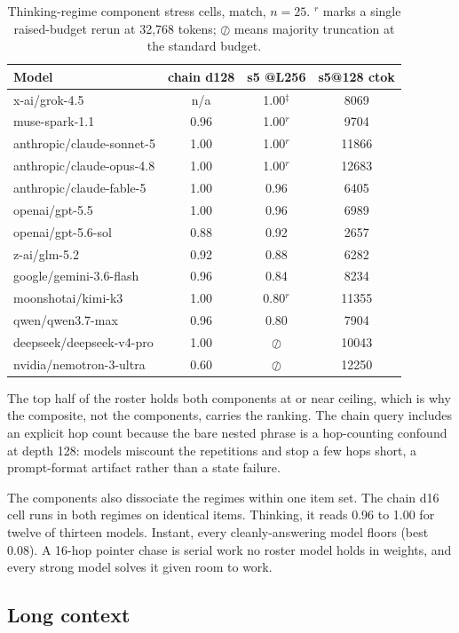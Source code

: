 \documentclass[11pt]{article}
\newcommand{\markr}{$^{r}$}
\newcommand{\markddag}{$^{\ddagger}$}
\newcommand{\censored}{$\oslash$}
\begin{document}
\begin{table}[h]
\centering
\begin{tabular}{lccc}
\toprule
Model & chain d128 & s5 @L256 & s5@128 ctok \\
\midrule
x-ai/grok-4.5 & n/a & 1.00\markddag & 8069 \\
muse-spark-1.1 & 0.96 & 1.00\markr & 9704 \\
anthropic/claude-sonnet-5 & 1.00 & 1.00\markr & 11866 \\
anthropic/claude-opus-4.8 & 1.00 & 1.00\markr & 12683 \\
anthropic/claude-fable-5 & 1.00 & 0.96 & 6405 \\
openai/gpt-5.5 & 1.00 & 0.96 & 6989 \\
openai/gpt-5.6-sol & 0.88 & 0.92 & 2657 \\
z-ai/glm-5.2 & 0.92 & 0.88 & 6282 \\
google/gemini-3.6-flash & 0.96 & 0.84 & 8234 \\
moonshotai/kimi-k3 & 1.00 & 0.80\markr & 11355 \\
qwen/qwen3.7-max & 0.96 & 0.80 & 7904 \\
deepseek/deepseek-v4-pro & 1.00 & \censored & 10043 \\
nvidia/nemotron-3-ultra & 0.60 & \censored & 12250 \\
\bottomrule
\end{tabular}
\caption{Thinking-regime component stress cells, match, $n=25$. \markr{} marks a single
raised-budget rerun at 32{,}768 tokens; \censored{} means majority truncation at the standard
budget.}
\label{tab:components}
\end{table}

The top half of the roster holds both components at or near ceiling, which is why the
composite, not the components, carries the ranking. The chain query includes an explicit hop
count because the bare nested phrase is a hop-counting confound at depth 128: models miscount
the repetitions and stop a few hops short, a prompt-format artifact rather than a state
failure.

The components also dissociate the regimes within one item set. The chain d16 cell runs in
both regimes on identical items. Thinking, it reads 0.96 to 1.00 for twelve of thirteen
models. Instant, every cleanly-answering model floors (best 0.08). A 16-hop pointer chase is
serial work no roster model holds in weights, and every strong model solves it given room to
work.

\subsection{Long context}
\end{document}
